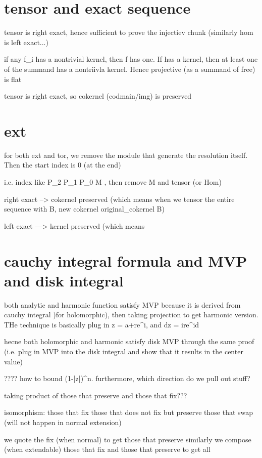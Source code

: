 {{\section*{tensor and exact sequence}
tensor is right exact, hence sufficient to prove the injectiev chunk
(similarly hom is left exact...) 


if any f_i has a nontrivial kernel, then f has one. If  has a kernel, then at least one of the summand has a nontriivla kernel. Hence projective (as a summand of free) is flat

tensor is right exact, so cokernel (codmain/img) is preserved

\section*{ext}
for both ext and tor, we remove the module that generate the resolution itself. Then the start index is 0 (at the end)

i.e. index like P_2 \to P_1 \to P_0 \to M , then remove M and tensor (or Hom)

right exact --> cokernel preserved (which means when we tensor the entire sequence with B, new cokernel \cong original_cokernel \otimes B)

left exact ---> kernel preserved (which means 

\section*{cauchy integral formula and MVP and disk integral}
both analytic and harmonic function satisfy MVP because it is derived from cauchy integral )for holomorphic), then taking projection to get harmonic version. THe technique is basically plug in z = a+re^{i\theta}, and dz = ire^{i\theta}d\theta

hecne both holomorphic and harmonic satisfy disk MVP through the same proof (i.e. plug in MVP into the disk integral and show that it results in the center value)


???? how to bound (1-|z|)^n. furthermore, which direction do we pull out stuff?



taking product of those that preserve and those that fix???


isomorphism:
those that fix
those that does not fix but preserve
those that swap (will not happen in normal extension)

we quote the fix (when normal) to get those that preserve
similarly we compose (when extendable) those that fix and those that preserve to get all

}}
